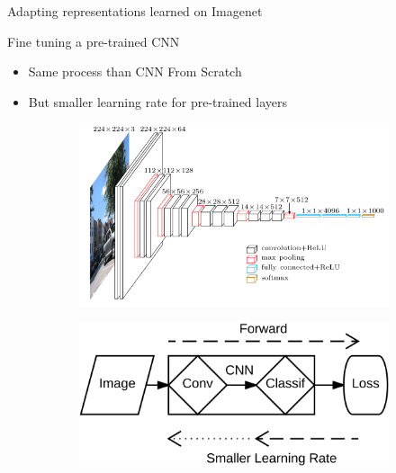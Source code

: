 \begin{frame}{Adapting representations learned on Imagenet}

	\begin{block}{\small Fine tuning a pre-trained CNN}
		\vspace{-.2cm}
	\begin{itemize}
		\item Same process than CNN From Scratch
		\item But smaller learning rate for pre-trained layers
	\end{itemize}
	\end{block}
	
		\vspace{-.2cm}
	
	\begin{figure}
		\centering
		\begin{subfigure}{.59\textwidth}
			\centering
			\includegraphics[width=.99\linewidth]{images/vgg16.png}
			\label{fig:dsg1}
		\end{subfigure}%
		\begin{subfigure}{.39\textwidth}
			\centering
			\includegraphics[width=.99\linewidth]{images/FineTuning.png}
			\label{fig:dsg2}
		\end{subfigure}
		\label{fig:dsgimages}
	\end{figure}	

\end{frame}

